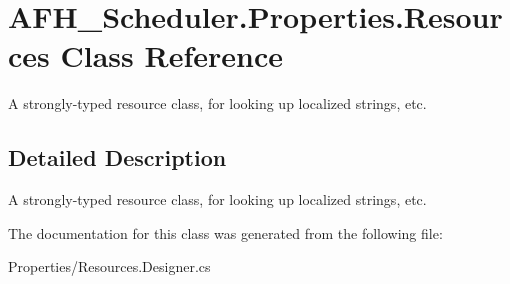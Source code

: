 \section{A\+F\+H\+\_\+\+Scheduler.\+Properties.\+Resources Class Reference}
\label{class_a_f_h___scheduler_1_1_properties_1_1_resources}


A strongly-\/typed resource class, for looking up localized strings, etc.  




\subsection{Detailed Description}
A strongly-\/typed resource class, for looking up localized strings, etc. 



The documentation for this class was generated from the following file\+:\begin{DoxyCompactItemize}
\item 
Properties/Resources.\+Designer.\+cs\end{DoxyCompactItemize}

